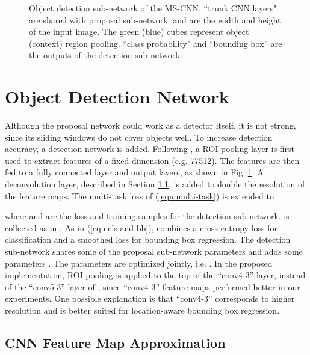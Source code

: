 \documentclass[runningheads]{llncs}
\begin{document}
\begin{figure}[!t]
\centering
\centerline{}
\caption{Object detection sub-network of the MS-CNN. ``trunk CNN layers" are shared with proposal sub-network.  and  are the
width and height of the input image. The green (blue) cubes represent
object (context) region pooling. ``class probability" and ``bounding box'' are the outputs of the detection sub-network.}
\label{fig:frcnn}
\end{figure}


\section{Object Detection Network}

Although the proposal network could work as a detector itself, it is not
strong, since its sliding windows do not cover objects well. To increase detection accuracy, a detection network is added.
Following \cite{DBLP:conf/iccv/Girshick15}, a ROI pooling layer is first used to extract features of a fixed dimension (e.g. 77512). The
features are then fed to a fully connected layer and output layers, as
shown in Fig. \ref{fig:frcnn}. A deconvolution layer,  described in
Section \ref{subsec:size}, is added to double the resolution of the feature
maps. The multi-task loss of (\ref{equ:multi-task}) is extended to

where  and  are the loss and training samples for the
detection sub-network.  is collected as
in \cite{DBLP:conf/iccv/Girshick15}. As in (\ref{equ:cls and bb}), 
combines a cross-entropy loss for classification and a smoothed  loss
for bounding box regression. The detection sub-network shares some of the
proposal sub-network parameters  and adds some
parameters . The parameters are optimized jointly,
i.e.
.
In the proposed implementation, ROI pooling is applied to the top of
the ``conv4-3'' layer, instead of the ``conv5-3'' layer of
\cite{DBLP:conf/iccv/Girshick15}, since ``conv4-3'' feature maps
performed better in our experiments. One possible explanation is that
``conv4-3'' corresponds to higher resolution and is better suited for
location-aware bounding box regression.


\subsection{CNN Feature Map Approximation}
\label{subsec:size}
\end{document}
